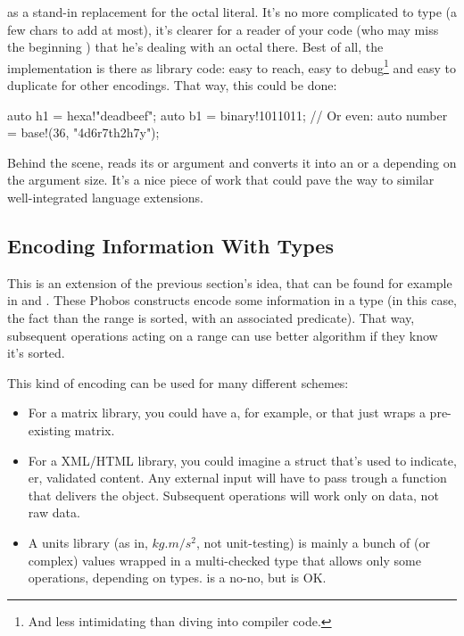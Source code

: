 as a stand-in replacement for the  octal literal. It's no more complicated to type (a few chars to add at most), it's clearer for a reader of your code (who may miss the beginning ) that he's dealing with an octal there. Best of all, the implementation is there as library code: easy to reach, easy to debug\footnote{ And less intimidating than diving into compiler code.} and easy to duplicate for other encodings. That way, this could be done:

\begin{dcode}
auto h1 = hexa!"deadbeef";
auto b1 = binary!1011011;
// Or even:
auto number = base!(36, "4d6r7th2h7y");
\end{dcode}

Behind the scene,  reads its  or  argument and converts it into an  or a  depending on the argument size.  It's a nice piece of work that could pave the way to similar well-integrated language extensions.



\subsection{Encoding Information With Types}
\label{encodinginformationwithtypes}

This is an extension of the previous section's idea, that can be found for example in  and . These Phobos constructs encode some information in a type (in this case, the fact than the range is sorted, with an associated predicate). That way, subsequent operations acting on a range can use better algorithm if they know it's sorted.

This kind of encoding can be used for many different schemes:

\begin{itemize}
\item For a matrix library, you could have a, for example,  or  that just wraps a pre-existing matrix.
\item For a XML/HTML library, you could imagine a  struct that's used to indicate, er, validated content. Any external input will have to pass trough a  function that delivers the  object. Subsequent operations will work only on  data, not raw data.
\item A units library (as in, $kg.m/s^{2}$, not unit-testing) is mainly a bunch of  (or complex) values wrapped in a multi-checked type that allows only some operations, depending on types.  is a no-no, but  is OK.
\end{itemize}

